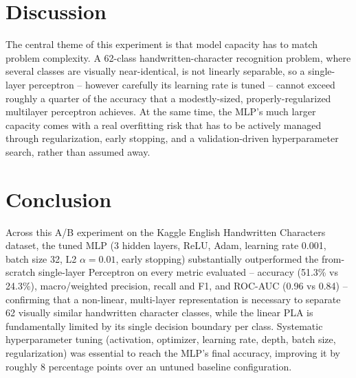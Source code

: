 \documentclass[12pt,a4paper]{article}
\begin{document}
\section{Discussion}
The central theme of this experiment is that model capacity has to match problem complexity. A
62-class handwritten-character recognition problem, where several classes are visually near-identical,
is not linearly separable, so a single-layer perceptron -- however carefully its learning rate is
tuned -- cannot exceed roughly a quarter of the accuracy that a modestly-sized, properly-regularized
multilayer perceptron achieves. At the same time, the MLP's much larger capacity comes with a real
overfitting risk that has to be actively managed through regularization, early stopping, and a
validation-driven hyperparameter search, rather than assumed away.

\section{Conclusion}
Across this A/B experiment on the Kaggle English Handwritten Characters dataset, the tuned MLP
(3 hidden layers, ReLU, Adam, learning rate 0.001, batch size 32, L2 $\alpha=0.01$, early stopping)
substantially outperformed the from-scratch single-layer Perceptron on every metric evaluated --
accuracy (51.3\% vs 24.3\%), macro/weighted precision, recall and F1, and ROC-AUC (0.96 vs 0.84) --
confirming that a non-linear, multi-layer representation is necessary to separate 62 visually similar
handwritten character classes, while the linear PLA is fundamentally limited by its single decision
boundary per class. Systematic hyperparameter tuning (activation, optimizer, learning rate, depth,
batch size, regularization) was essential to reach the MLP's final accuracy, improving it by roughly
8 percentage points over an untuned baseline configuration.
\end{document}
